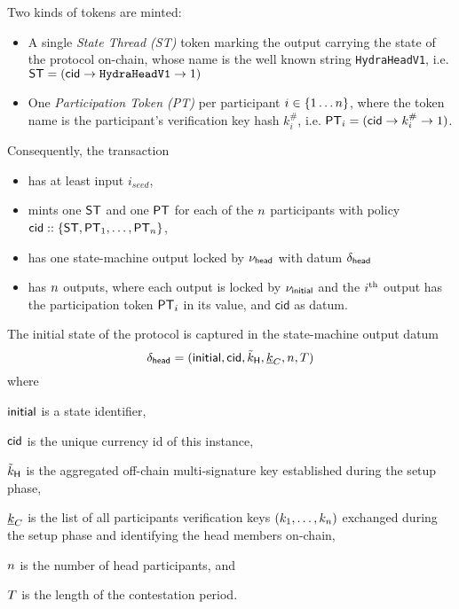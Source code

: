 \vspace{0.1cm}
\noindent Two kinds of tokens are minted:
\begin{itemize}
  \item A single \emph{State Thread (ST)} token marking the output carrying the state
        of the protocol on-chain, whose name is the well known string
        \texttt{HydraHeadV1}, i.e.
        $\mathsf{ST} = (\mathsf{cid} \rightarrow \texttt{HydraHeadV1} \rightarrow 1)$
  \item One \emph{Participation Token (PT)} per participant
        $i \in \{1 \dots n \}$, where the token name is the participant's
        verification key hash $k_i^{\#}$, i.e.
        $\mathsf{PT}_{i} = (\mathsf{cid} \rightarrow k_{i}^{\#} \rightarrow 1)$.
\end{itemize}

\noindent Consequently, the \mtxInit{} transaction

\begin{itemize}
  \item has at least input $i_{seed}$,
  \item mints one $\mathsf{ST}$ and one $\mathsf{PT}$ for each of the $n$ participants with
        policy $\mathsf{cid} :: \{\mathsf{ST}, \mathsf{PT}_{1}, \ldots, \mathsf{PT}_{n}\}$,
  \item has one state-machine output locked by $\nu_\mathsf{head}$ with datum
        $\delta_{\mathsf{head}}$
  \item has $n$ outputs, where each output is locked by $\nu_\mathsf{initial}$ and the
        $i^{\text{th}}$ output has the participation token $\mathsf{PT}_i$ in its value, and
        $\mathsf{cid}$ as datum.
\end{itemize}

\noindent The initial state of the protocol is captured in the state-machine output datum
\[
  \delta_{\mathsf{head}} = (\mathsf{initial},\mathsf{cid},\tilde{k}_{\mathsf{H}},\underline{k}_C,n,T)
\]
where
\begin{mitemize}
  \item $\mathsf{initial}$ is a state identifier,
  \item $\mathsf{cid}$ is the unique currency id of this instance,
  \item $\tilde{k}_{\mathsf{H}}$ is the aggregated off-chain multi-signature key established during the
  setup phase,
  \item $\underline{k}_C$ is the list of all participants verification keys
  $(k_1,\ldots,k_n)$ exchanged during the setup phase and identifying the
  head members on-chain,
  \item $n$ is the number of head participants, and
  \item $T$ is the length of the contestation period.
\end{mitemize}


